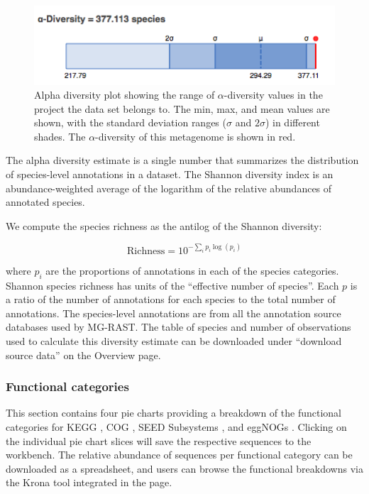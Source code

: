 \documentclass[12pt,fullpage]{report}
\begin{document}
\begin{figure}
\begin{center}
\includegraphics[width=6in]{Images/alpha-diversity.png}
\end{center}
\caption{
Alpha diversity plot showing the range of  {$\alpha$}-diversity values in the project the data set belongs to. The min, max, and mean values are shown, with the standard deviation ranges ($\sigma$ and $2\sigma$) in different shades. The {$\alpha$}-diversity of this metagenome is shown in red.
}
\label{fig:alpha-diversity}
\end{figure}

The alpha diversity estimate is a single number that summarizes the distribution of species-level annotations in a dataset.   The Shannon diversity index is an abundance-weighted average of the logarithm of the relative abundances of annotated species.

We compute the species richness as the antilog of the Shannon diversity:

$$ \textrm{Richness} = 10^{-\sum_i  p_i \log(p_i) }  $$

\noindent
where $p_i$ are the proportions of annotations in each of the species categories.
Shannon species richness
has units of  the ``effective number of species''. Each $p$ is a ratio of the number of annotations for each species to the total number of annotations.
The species-level annotations are from all the annotation source databases used by MG-RAST. The table of species and number of observations used to calculate this diversity estimate can be downloaded under ``download source data'' on the Overview page.
\subsubsection{Functional categories}

This section contains four pie charts providing a breakdown of the functional categories for KEGG \cite{KEGG}, COG \cite{COG}, \gls{SEED} \gls{Subsystem}s \cite{SUBSYSTEMS}, and eggNOGs \cite{EGGNOG}. Clicking on the individual pie chart slices will save the respective sequences to the workbench.
The relative abundance of sequences per functional category can be downloaded as a spreadsheet, and users can browse the functional breakdowns via the Krona tool \cite{KRONA} integrated in the page.
\end{document}
